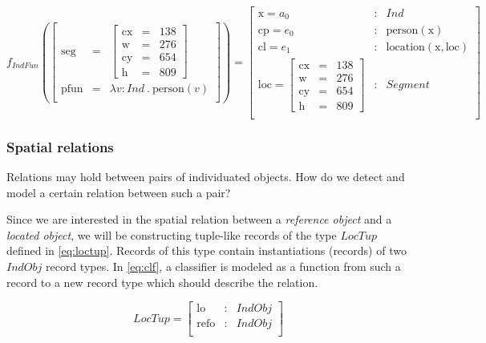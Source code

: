 \begin{equation}\label{eq:indfunrec}
f_{IndFun}(
\left[\begin{array}{rcl}
\text{seg} &=& \left[\begin{array}{rcl}
\text{cx} &=& 138\\
\text{w} &=& 276\\
\text{cy} &=& 654\\
\text{h} &=& 809
\end{array}\right]\\
\text{pfun} &=& \lambda v:Ind\ .\ \text{person}(v)\\
\end{array}\right]
) =
\left[\begin{array}{lcl}
    \text{x} = a_0 &:& Ind \\
    \text{cp} = e_0 &:& \text{person}(\text{x}) \\
    \text{cl} = e_1 &:& \text{location}(\text{x}, \text{loc}) \\
    \text{loc} = \left[\begin{array}{rcl}
\text{cx} &=& 138\\
\text{w} &=& 276\\
\text{cy} &=& 654\\
\text{h} &=& 809
\end{array}\right] &:& Segment\\
\end{array}\right]
\end{equation}



\subsubsection{Spatial relations}

Relations may hold between pairs of individuated objects.
How do we detect and model a certain relation between such a pair?

Since we are interested in the spatial relation between a \textit{reference object} and a \textit{located object}, we will be constructing tuple-like records of the type $LocTup$ defined in \autoref{eq:loctup}.
Records of this type contain instantiations (records) of two $IndObj$ record types.
In \autoref{eq:clf}, a classifier is modeled as a function from such a record to a new record type which should describe the relation.

\begin{equation}\label{eq:loctup}
LocTup = \left[\begin{array}{rcl}
    \text{lo} &:& IndObj \\
    \text{refo} &:& IndObj \\
    \end{array}\right]
\end{equation}

